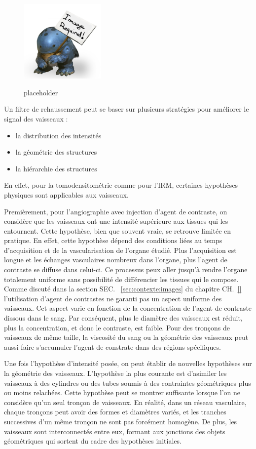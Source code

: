 \begin{figure}
  \centering
  \includegraphics[height=4cm]{Images/img_required.jpg}
  \label{fig:placeholder}
  \caption{placeholder}
\end{figure}

Un filtre de rehaussement peut se baser sur plusieurs stratégies pour améliorer le signal des vaisseaux :

\begin{itemize}
\item la distribution des intensités
\item la géométrie des structures
\item la hiérarchie des structures
\end{itemize}

En effet, pour la tomodensitométrie comme pour l'IRM, certaines hypothèses physiques sont applicables aux vaisseaux.

Premièrement, pour l'angiographie avec injection d'agent de contraste, on considère que les vaisseaux ont une intensité supérieure aux tissues qui les entournent. Cette hypothèse, bien que souvent vraie, se retrouve limitée en pratique. En effet, cette hypothèse dépend des conditions liées au temps d'acquisition et de la vascularisation de l'organe étudié. Plus l'acquisition est longue et les échanges vasculaires nombreux dans l'organe, plus l'agent de contraste se diffuse dans celui-ci. Ce processus peux aller jusqu'à rendre l'organe totalement uniforme sans possibilité de différencier les tissues qui le compose. Comme discuté dans la section SEC. ~\ref{sec:contexte:images} du chapitre CH.~\ref{} l'utilisation d'agent de contrastes ne garanti pas un aspect uniforme des vaisseaux. Cet aspect varie en fonction de la concentration de l'agent de contraste dissous dans le sang. Par conséquent, plus le diamètre des vaisseaux est réduit, plus la concentration, et donc le contraste, est faible. Pour des tronçons de vaisseaux de même taille, la viscosité du sang ou la géométrie des vaisseaux peut aussi faire s'accumuler l'agent de constrate dans des régions spécifiques.

Une fois l'hypothèse d'intensité posée, on peut établir de nouvelles hypothèses sur la géométrie des vaisseaux. L'hypothèse la plus courante est d'asimiler les vaisseaux à des cylindres ou des tubes soumis à des contraintes géométriques plus ou moins relachées. Cette hypothèse peut se montrer suffisante lorsque l'on ne considère qu'un seul tronçon de vaisseaux. En réalité, dans un réseau vasculaire, chaque tronçons peut avoir des formes et diamètres variés, et les tranches successives d'un même tronçon ne sont pas forcément homogène. De plus, les vaisseaux sont interconnectés entre eux, formant aux jonctions des objets géométriques qui sortent du cadre des hypothèses initiales.

